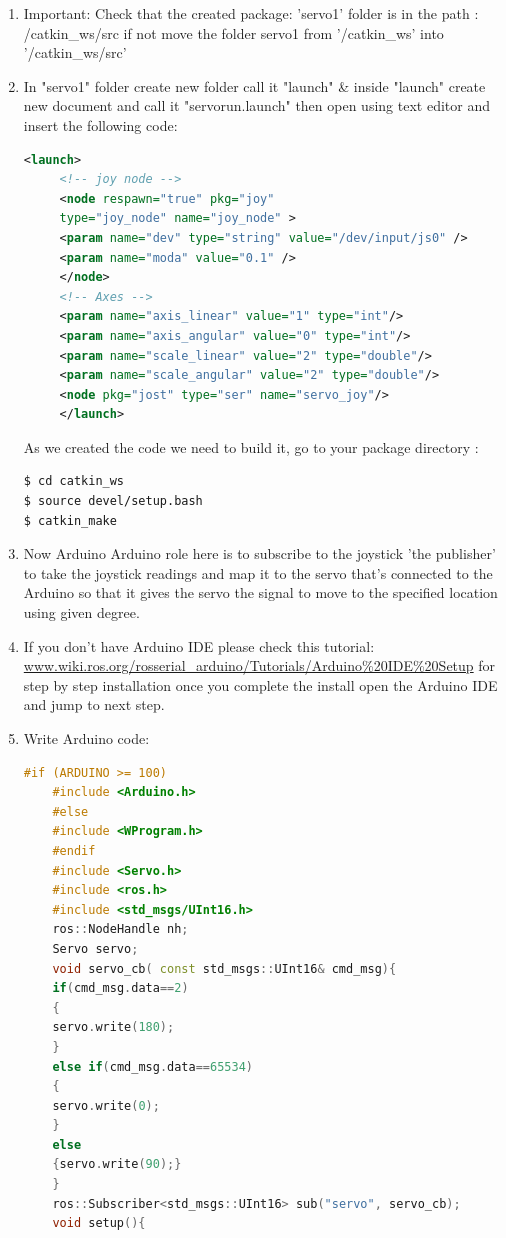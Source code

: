 \begin{enumerate}
     \item Important: Check that the created package: 'servo1' folder is in the path : /catkin\_ws/src
 	if not move the folder servo1 from '/catkin\_ws' into '/catkin\_ws/src'
 	
     \item In "servo1" folder create new folder call it "launch" \& inside "launch" create new document and call it "servorun.launch" then open using text editor and insert the following code:\\
     \begin{lstlisting}[language=XML]
     <launch>
     <!-- joy node -->
     <node respawn="true" pkg="joy"
     type="joy_node" name="joy_node" >
     <param name="dev" type="string" value="/dev/input/js0" />
     <param name="moda" value="0.1" />
     </node>
     <!-- Axes -->
     <param name="axis_linear" value="1" type="int"/>
     <param name="axis_angular" value="0" type="int"/>
     <param name="scale_linear" value="2" type="double"/>
     <param name="scale_angular" value="2" type="double"/>
     <node pkg="jost" type="ser" name="servo_joy"/>
     </launch>
     \end{lstlisting}
 	As we created the code we need to build it, go to your package directory : 
     \begin{lstlisting}[language=terCmd]
$ cd catkin_ws
$ source devel/setup.bash
$ catkin_make
     \end{lstlisting}

     \item Now Arduino
 	Arduino role here is to subscribe to the joystick 'the publisher' to take the joystick readings and map it to the servo that's connected to the Arduino so that it gives the servo the signal to move to the specified location using given degree.
 	\item If you don't have Arduino IDE please check this tutorial: \url{www.wiki.ros.org/rosserial_arduino/Tutorials/Arduino%20IDE%20Setup}
 	for step by step installation once you complete the install open the Arduino IDE and jump to next step.
 	\item Write Arduino code:
 		\begin{lstlisting}[language=C++]
 	#if (ARDUINO >= 100)
 	#include <Arduino.h>
 	#else
 	#include <WProgram.h>
 	#endif
 	#include <Servo.h>
 	#include <ros.h>
 	#include <std_msgs/UInt16.h>
 	ros::NodeHandle nh;
 	Servo servo;
 	void servo_cb( const std_msgs::UInt16& cmd_msg){
 	if(cmd_msg.data==2)
 	{
 	servo.write(180);
 	}
 	else if(cmd_msg.data==65534)
 	{
 	servo.write(0);
 	}
 	else
 	{servo.write(90);}
 	}
 	ros::Subscriber<std_msgs::UInt16> sub("servo", servo_cb);
 	void setup(){
 	

\end{lstlisting}
\end{enumerate}
